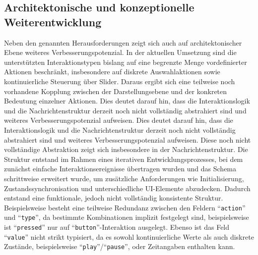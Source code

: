 \subsection{Architektonische und konzeptionelle Weiterentwicklung}
Neben den genannten Herausforderungen zeigt sich auch auf architektonischer Ebene weiteres Verbesserungspotenzial. In der aktuellen Umsetzung sind die unterstützten Interaktionstypen bislang auf eine begrenzte Menge vordefinierter Aktionen beschränkt, insbesondere auf diskrete Auswahlaktionen sowie kontinuierliche Steuerung über Slider. Daraus ergibt sich eine teilweise noch vorhandene Kopplung zwischen der Darstellungsebene und der konkreten Bedeutung einzelner Aktionen.
Dies deutet darauf hin, dass die Interaktionslogik und die Nachrichtenstruktur derzeit noch nicht vollständig abstrahiert sind und weiteres Verbesserungspotenzial aufweisen.
Dies deutet darauf hin, dass die Interaktionslogik und die Nachrichtenstruktur derzeit noch nicht vollständig abstrahiert sind und weiteres Verbesserungspotenzial aufweisen.
Diese noch nicht vollständige Abstraktion zeigt sich insbesondere in der Nachrichtenstruktur. Die Struktur entstand im Rahmen eines iterativen Entwicklungsprozesses, bei dem zunächst einfache Interaktionsereignisse übertragen wurden und das Schema schrittweise erweitert wurde, um zusätzliche Anforderungen wie Initialisierung, Zustandssynchronisation und unterschiedliche UI-Elemente abzudecken. Dadurch entstand eine funktionale, jedoch nicht vollständig konsistente Struktur.
Beispielsweise besteht eine teilweise Redundanz zwischen den Feldern ``\texttt{action}'' und ``\texttt{type}'', da bestimmte Kombinationen implizit festgelegt sind, beispielsweise ist ``\texttt{pressed}'' nur auf ``\texttt{button}''-Interaktion ausgelegt. Ebenso ist das Feld ``\texttt{value}'' nicht strikt typisiert, da es sowohl kontinuierliche Werte als auch diskrete Zustände, beispielsweise ``\texttt{play}''/``\texttt{pause}'', oder Zeitangaben enthalten kann.

